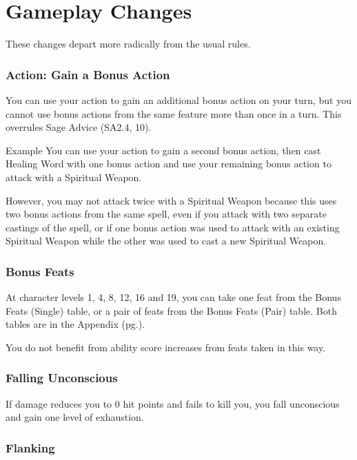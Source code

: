 \documentclass[letterpaper,twocolumn,openany,nodeprecatedcode]{dndbook}
\newcommand{\pg}[1]{pg.\pageref{#1}}
\begin{document}
\chapter{Gameplay Changes}

These changes depart more radically from the usual rules.

\label{gameplay-bonus-action}
\subsection{Action: Gain a Bonus Action}
You can use your action to gain an additional bonus action on your turn, but you cannot use bonus actions from the same feature more than once in a turn. This overrules Sage Advice (SA2.4, 10).

\begin{DndComment}{Example}
You can use your action to gain a second bonus action, then cast Healing Word with one bonus action and use your remaining bonus action to attack with a Spiritual Weapon. 

However, you may not attack twice with a Spiritual Weapon because this uses two bonus actions from the same spell, even if you attack with two separate castings of the spell, or if one bonus action was used to attack with an existing Spiritual Weapon while the other was used to cast a new Spiritual Weapon.
\end{DndComment}

\label{gameplay-feats-bonus}
\subsection{Bonus Feats}
At character levels 1, 4, 8, 12, 16 and 19, you can take one feat from the Bonus Feats (Single) table, or a pair of feats from the Bonus Feats (Pair) table. Both tables are in the Appendix (\pg{appendix-feats-bonus-table}).

You do not benefit from ability score increases from feats taken in this way.

\subsection{Falling Unconscious}
If damage reduces you to 0 hit points and fails to kill you, you fall unconscious and gain one level of exhaustion.

\subsection{Flanking}
\end{document}
